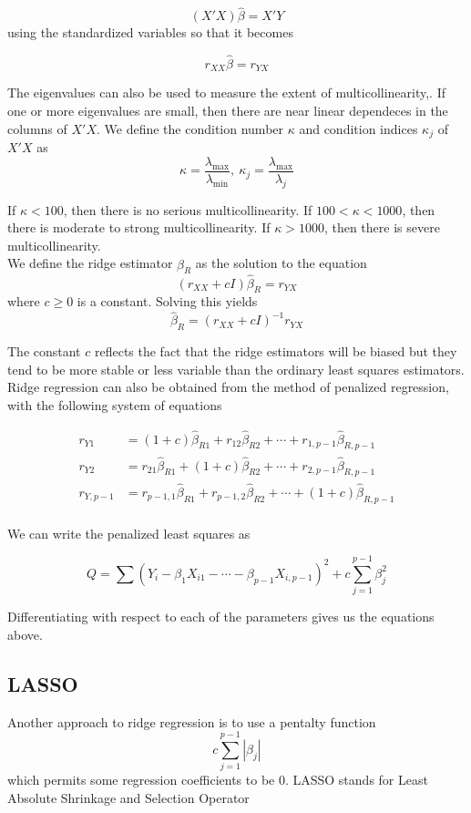 \[(X'X)\hat{\beta} = X'Y\]
\noindent
using the standardized variables so that it becomes 

\[r_{XX}\hat{\beta} = r_{YX}\]

The eigenvalues can also be used to measure the extent of multicollinearity,. If one or more eigenvalues are small, then there are near linear dependeces in the columns of $X'X$. We define the condition number $\kappa$ and condition indices $\kappa_j$ of $X'X$ as 
\[\kappa = \frac{\lambda_{\max}}{\lambda_{\min}}, \ \kappa_j = \frac{\lambda_{\max}}{\lambda_j}\]

If $\kappa < 100$, then there is no serious multicollinearity. If $100 < \kappa < 1000$, then there is moderate to strong multicollinearity. If $\kappa > 1000$, then there is severe multicollinearity.\\
\noindent
We define the ridge estimator $\hat{\beta}_R$ as the solution to the equation
\[(r_{XX} + cI)\hat{\beta}_R = r_{YX}\]
where $c \geq 0$ is a constant. Solving this yields 
\[\hat{\beta}_R = (r_{XX} + cI)^{-1}r_{YX}\]

The constant $c$ reflects the fact that the ridge estimators will be biased but they tend to be more stable or less variable than the ordinary least squares estimators. Ridge regression can also be obtained from the method of penalized regression, with the following system of equations 

\begin{align*}
    r_{Y1} &= (1+c)\hat{\beta}_{R1} + r_{12}\hat{\beta}_{R2} + \cdots + r_{1,p-1}\hat{\beta}_{R,p-1}\\
    r_{Y2} &= r_{21}\hat{\beta}_{R1} + (1+c)\hat{\beta}_{R2} + \cdots + r_{2,p-1}\hat{\beta}_{R,p-1}\\
    r_{Y,p-1} &= r_{p-1,1}\hat{\beta}_{R1} + r_{p-1,2}\hat{\beta}_{R2} + \cdots + (1+c)\hat{\beta}_{R,p-1}\\
\end{align*}

We can write the penalized least squares as 

\[Q = \sum (Y_i - \beta_1 X_{i1} - \cdots - \beta_{p-1}X_{i,p-1})^2 + c\sum_{j=1}^{p-1}\beta_j^2\]

Differentiating with respect to each of the parameters gives us the equations above.

\subsection{LASSO}

Another approach to ridge regression is to use a pentalty function 
\[c \sum_{j=1}^{p-1}|\beta_j|\]
which permits some regression coefficients to be 0. LASSO stands for Least Absolute Shrinkage and Selection Operator